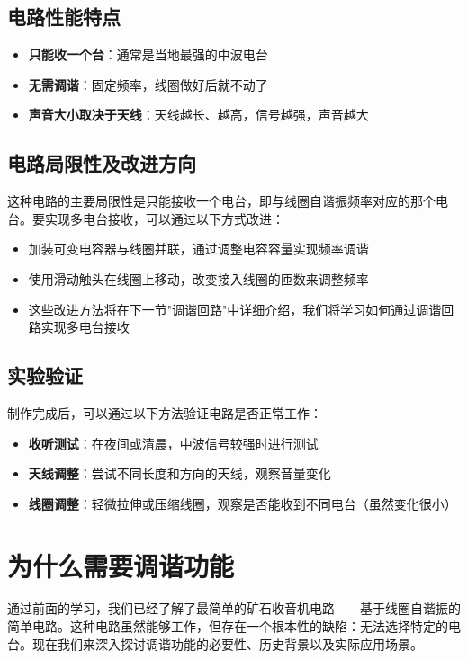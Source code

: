 \documentclass[12pt,UTF8]{ctexbook}
\begin{document}
\subsection{电路性能特点}

\begin{itemize}[leftmargin=3.5em]
	\item \textbf{只能收一个台}：通常是当地最强的中波电台
	\item \textbf{无需调谐}：固定频率，线圈做好后就不动了
	\item \textbf{声音大小取决于天线}：天线越长、越高，信号越强，声音越大
\end{itemize}

\subsection{电路局限性及改进方向}

这种电路的主要局限性是只能接收一个电台，即与线圈自谐振频率对应的那个电台。要实现多电台接收，可以通过以下方式改进：
\begin{itemize}[leftmargin=3.5em]
	\item 加装可变电容器与线圈并联，通过调整电容容量实现频率调谐
	\item 使用滑动触头在线圈上移动，改变接入线圈的匝数来调整频率
	\item 这些改进方法将在下一节"调谐回路"中详细介绍，我们将学习如何通过调谐回路实现多电台接收
\end{itemize}

\subsection{实验验证}

制作完成后，可以通过以下方法验证电路是否正常工作：
\begin{itemize}[leftmargin=3.5em]
	\item \textbf{收听测试}：在夜间或清晨，中波信号较强时进行测试
	\item \textbf{天线调整}：尝试不同长度和方向的天线，观察音量变化
	\item \textbf{线圈调整}：轻微拉伸或压缩线圈，观察是否能收到不同电台（虽然变化很小）
\end{itemize}

\section{为什么需要调谐功能}

通过前面的学习，我们已经了解了最简单的矿石收音机电路——基于线圈自谐振的简单电路。这种电路虽然能够工作，但存在一个根本性的缺陷：无法选择特定的电台。现在我们来深入探讨调谐功能的必要性、历史背景以及实际应用场景。
\end{document}
